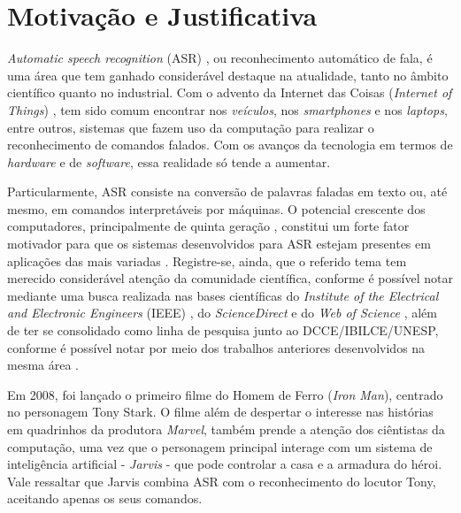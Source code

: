 \documentclass[a4paper,12pt,twoside,openright]{report}
\begin{document}
\section{Motiva\c{c}\~{a}o e Justificativa}
\par \textit{Automatic speech recognition} (ASR) \cite{deng}, ou reconhecimento autom\'{a}tico de fala, \'{e} uma \'{a}rea que tem ganhado consider\'{a}vel destaque na atualidade, tanto no \^{a}mbito cient\'{i}fico quanto no industrial. Com o advento da Internet das Coisas (\textit{Internet of Things}) \cite{iot}, tem sido comum encontrar nos \textit{ve\'{i}culos}, nos \textit{smartphones} e nos \textit{laptops}, entre outros, sistemas que fazem uso da computa{\c c}\~{a}o para realizar o reconhecimento de comandos falados. Com os avan{\c c}os da tecnologia em termos de \textit{hardware} e de \textit{software}, essa realidade s\'{o} tende a aumentar. 
\\
\par Particularmente, ASR consiste na convers\~{a}o de palavras faladas em texto ou, at\'{e} mesmo, em comandos interpret\'{a}veis por m\'{a}quinas. O potencial crescente dos computadores, principalmente de quinta gera\c{c}\~{a}o \cite{arquit}, constitui um forte fator motivador para que os sistemas desenvolvidos para ASR estejam presentes em aplica\c{c}\~{o}es das mais variadas \cite{Pattern_Recognition}. Registre-se, ainda, que o referido tema tem merecido consider\'{a}vel aten\c{c}\~{a}o da comunidade cient\'{i}fica, conforme \'{e} poss\'{i}vel notar mediante uma busca realizada nas bases cient\'{i}ficas do \textit{Institute of the Electrical and Electronic Engineers} (IEEE) \cite{ieee}, do \textit{ScienceDirect} \cite{sciencedirect} e do \textit{Web of Science} \cite{webofscience}, al\'{e}m de ter se consolidado como linha de pesquisa junto ao DCCE/IBILCE/UNESP, conforme \'{e} poss\'{i}vel notar por meio dos trabalhos anteriores desenvolvidos na mesma \'{a}rea \cite{Marcel_Kfouri} \cite{Ana_Paula} \cite{Joao_Vitor_Maschio}.
\\
\par Em 2008, foi lan{\c c}ado o primeiro filme do Homem de Ferro (\textit{Iron Man}), centrado no personagem Tony Stark. O filme al\'{e}m de despertar o interesse nas hist\'{o}rias em quadrinhos da produtora \textit{Marvel}, tamb\'{e}m prende a aten{\c c}\~{a}o dos ci\^{e}ntistas da computa{\c c}\~{a}o, uma vez que o personagem principal interage com um sistema de intelig\^{e}ncia artificial - \textit{Jarvis} - que pode controlar a casa e a armadura do h\'{e}roi. Vale ressaltar que Jarvis combina ASR com o reconhecimento do locutor Tony, aceitando apenas os seus comandos. 
\end{document}
